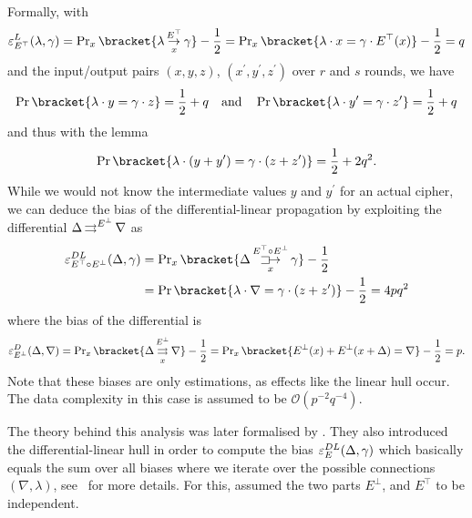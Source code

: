 Formally, with
\begin{equation*}
    \bias_{E^\top}^L(\lambda, \gamma) = \Prob_x\bracket{\propLin{\lambda}{E^\top}{x}{\gamma}} - \frac{1}{2} = \Prob_x\bracket{\iprod{\lambda}{x} = \iprod{\gamma}{E^\top(x)}} - \frac{1}{2} = q
\end{equation*}
and the input/output pairs $(x, y, z)$, $(x^\prime, y^\prime, z^\prime)$ over $r$ and $s$ rounds, we have
\begin{equation*}
        \Prob\bracket{\iprod{\lambda}{y} = \iprod{\gamma}{z}} = \frac{1}{2} + q
        \quad \text{and} \quad
        \Prob\bracket{\iprod{\lambda}{y^\prime} = \iprod{\gamma}{z^\prime}} = \frac{1}{2} + q
\end{equation*}
and thus with the  lemma
\begin{equation*}
        \Prob\bracket{\iprod{\lambda}{(y+y^\prime)} = \iprod{\gamma}{(z+z^\prime)}} = \frac{1}{2} + 2q^2.
\end{equation*}
While we would not know the intermediate values $y$ and $y^\prime$ for an actual cipher, we can deduce the bias of the differential-linear propagation by exploiting the differential $\Delta \operatorname*{\rightrightarrows}^{E^\bot}_{} \nabla$ as
\begin{equation}\label{eq:dl_bias_simple}
    \begin{aligned}
           \bias_{E^\top \circ E^\bot}^{DL}(\Delta, \gamma)
        &= \Prob_x\bracket{\propDL{\Delta}{E^\top \circ E^\bot}{x}{\gamma}} - \frac{1}{2} \\
        &= \Prob\bracket{\iprod{\lambda}{\nabla} = \iprod{\gamma}{(z+z^\prime)}} - \frac{1}{2} = 4pq^2
    \end{aligned}
\end{equation}
where the bias of the differential is
\begin{equation*}
    \bias_{E^\bot}^D(\Delta, \nabla) = \Prob_x\bracket{\propDiff{\Delta}{E^\bot}{x}{\nabla}} - \frac{1}{2} = \Prob_x\bracket{E^\bot(x) + E^\bot(x + \Delta) = \nabla} - \frac{1}{2} = p.
\end{equation*}
Note that these biases are only estimations, as effects like the linear hull occur.
The data complexity in this case is assumed to be $\mathcal{O}(p^{-2}q^{-4})$.

The theory behind this analysis was later formalised by \textcite{FSE:BloLeaNyb14,JC:BloLeaNyb17}.
They also introduced the differential-linear hull in order to compute the bias $\operatorname{\varepsilon}_{E}^{DL}(\Delta, \gamma)$ which basically equals the sum over all biases where we iterate over the possible connections $(\nabla,\lambda)$, see~\cite[Sections~3 and~4]{FSE:BloLeaNyb14} for more details.
For this, \citeauthor{FSE:BloLeaNyb14} assumed the two parts $E^\bot$, and $E^\top$ to be independent.

